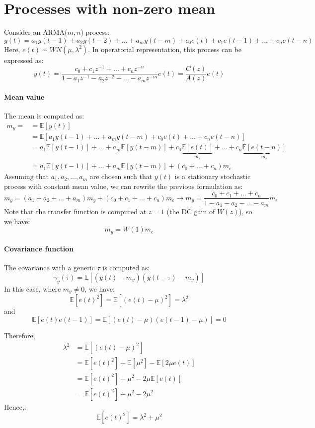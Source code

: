 \section{Processes with non-zero mean}

Consider an ARMA($m,n$) process:
\[y(t)=a_1y(t-1)+a_2y(t-2)+\dots+a_my(t-m)+c_0e(t)+c_1e(t-1)+\dots+c_ne(t-n) \]
Here, $e(t)\sim WN(\mu,\lambda^2)$.
In operatorial representation, this process can be expressed as:
\[y(t)=\dfrac{c_0+c_1z^{-1}+\dots+c_nz^{-n}}{1- a_1z^{-1}-a_2z^{-2}-\dots-a_mz^{-m}}e(t)=\dfrac{C(z)}{A(z)}e(t)\]

\paragraph*{Mean value}
The mean is computed as:
\begin{align*}
    m_y=    &= \mathbb{E}\left[y(t)\right]  \\
            &= \mathbb{E}\left[a_1y(t-1)+\dots+a_my(t-m)+c_0e(t)+\dots+c_ne(t-n)\right] \\
            &= a_1\mathbb{E}\left[y(t-1)\right]+\dots+a_m\mathbb{E}\left[y(t-m)\right]+c_0\underbrace{\mathbb{E}\left[e(t)\right]}_{m_e} +\dots+c_n\underbrace{\mathbb{E}\left[e(t-n)\right]}_{m_e} \\
            &= a_1\mathbb{E}\left[y(t-1)\right]+\dots+a_m\mathbb{E}\left[y(t-m)\right]+\left(c_0 +\dots+c_n\right)m_e 
\end{align*}
Assuming that $a_1,a_2,\dots,a_m$ are chosen such that $y(t)$ is a stationary stochastic process with constant mean value, we can rewrite the previous formulation as:
\[m_y=\left(a_1+a_2+\dots+a_m\right)m_y+\left(c_0 +c_1 +\dots+c_n\right)m_e \rightarrow m_y =\dfrac{c_0 +c_1 +\dots+c_n}{1-a_1-a_2-\dots-a_m}m_e\]
Note that the transfer function is computed at $z=1$ (the DC gain of $W(z)$), so we have:
\[m_y=W(1)m_e\]

\paragraph*{Covariance function}
The covariance with a generic $\tau$ is computed as:
\[\gamma_y(\tau)  = \mathbb{E}\left[\left(y(t)-m_y\right)\left(y(t-\tau)-m_y\right)\right]\]
In this case, where $m_y \neq 0$, we have:
\[\mathbb{E}\left[e(t)^2\right]=\mathbb{E}\left[\left(e(t)-\mu\right)^2\right]= \lambda^2\]
and 
\[\mathbb{E}\left[e(t)e(t-1)\right]=\mathbb{E}\left[\left(e(t)-\mu\right)\left(e(t-1)-\mu\right)\right]= 0\]

Therefore,
\begin{align*}
    \lambda^2   &=\mathbb{E}\left[ \left( e(t)-\mu \right)^2 \right] \\
                &=\mathbb{E}\left[ e(t)^2\right] +\mathbb{E}\left[\mu^2\right]-\mathbb{E}\left[2\mu e(t)  \right] \\
                &=\mathbb{E}\left[ e(t)^2\right] +\mu^2-2\mu \mathbb{E}\left[e(t)  \right] \\   
                &=\mathbb{E}\left[ e(t)^2\right] +\mu^2-2\mu^2
\end{align*}
Hence,: 
\[\mathbb{E}\left[e(t)^2\right]=\lambda^2+\mu^2\]

